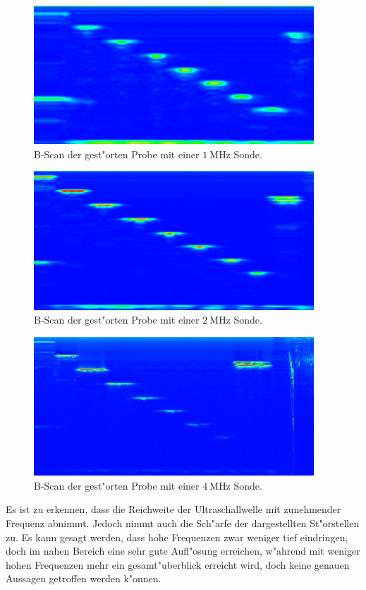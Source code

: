 \begin{figure}[!h]
	\centering
	\includegraphics[width = 10.5cm]{img/1MHZ.jpg}
	\caption{B-Scan der gest"orten Probe mit einer $\SI{1}{\mega\hertz}$ Sonde.}
	\label{b1}
\end{figure}

\begin{figure}[!h]
	\centering
	\includegraphics[width = 10.5cm]{img/2MHZ.jpg}
	\caption{B-Scan der gest"orten Probe mit einer $\SI{2}{\mega\hertz}$ Sonde.}
	\label{b2}
\end{figure}

\begin{figure}[!h]
	\centering
	\includegraphics[width = 10.5cm]{img/4MHZ.jpg}
	\caption{B-Scan der gest"orten Probe mit einer $\SI{4}{\mega\hertz}$ Sonde.}
	\label{b4}
\end{figure}

Es ist zu erkennen, dass die Reichweite der Ultraschallwelle mit zunehmender Frequenz abnimmt. Jedoch nimmt auch die Sch"arfe der dargestellten St"orstellen zu. Es kann gesagt werden, dass hohe Frequenzen zwar weniger tief eindringen, doch im nahen Bereich eine sehr gute Aufl"osung erreichen, w"ahrend mit weniger hohen Frequenzen mehr ein gesamt"uberblick erreicht wird, doch keine genauen Aussagen getroffen werden k"onnen.

